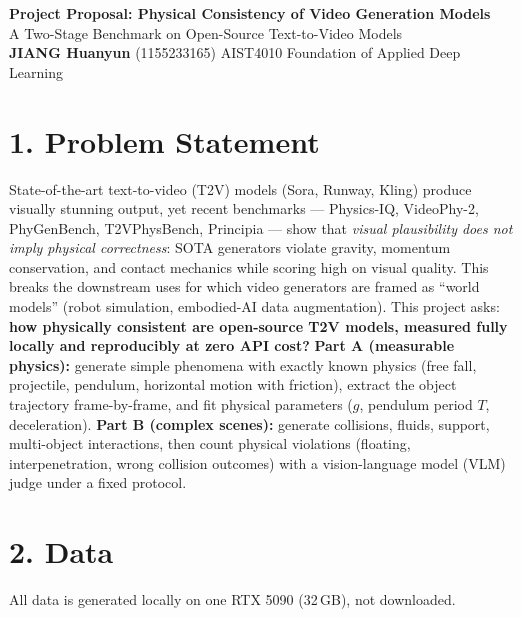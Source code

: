 \documentclass[10pt,a4paper]{article}
\begin{document}
\begin{center}
  {\Large\bfseries Project Proposal: Physical Consistency of Video Generation Models}\\[0.25em]
  {\normalsize A Two-Stage Benchmark on Open-Source Text-to-Video Models}\\[0.5em]
  \textbf{JIANG Huanyun} (1155233165) \quad AIST4010 Foundation of Applied Deep Learning
\end{center}

\section*{1. Problem Statement}

State-of-the-art text-to-video (T2V) models (Sora, Runway, Kling) produce visually
stunning output, yet recent benchmarks --- Physics-IQ, VideoPhy-2, PhyGenBench,
T2VPhysBench, Principia --- show that \emph{visual plausibility does not imply physical
correctness}: SOTA generators violate gravity, momentum conservation, and contact
mechanics while scoring high on visual quality. This breaks the downstream uses for
which video generators are framed as ``world models'' (robot simulation, embodied-AI
data augmentation). This project asks: \textbf{how physically consistent are open-source
T2V models, measured fully locally and reproducibly at zero API cost?} \textbf{Part A
(measurable physics):} generate simple phenomena with exactly known physics (free fall,
projectile, pendulum, horizontal motion with friction), extract the object trajectory
frame-by-frame, and fit physical parameters ($g$, pendulum period $T$, deceleration).
\textbf{Part B (complex scenes):} generate collisions, fluids, support, multi-object
interactions, then count physical violations (floating, interpenetration, wrong collision
outcomes) with a vision-language model (VLM) judge under a fixed protocol.

\section*{2. Data}

All data is generated locally on one RTX 5090 (32\,GB), not downloaded.
\end{document}
